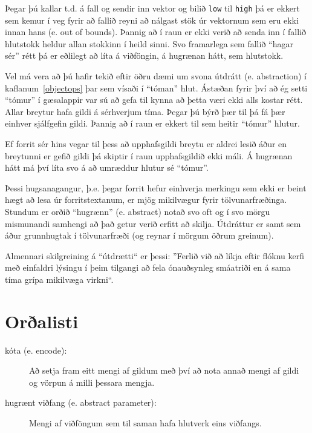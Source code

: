 Þegar þú kallar t.d. á fall og sendir inn vektor og bilið {\tt low} til {\tt high}
þá er ekkert sem kemur í veg fyrir að fallið reyni að nálgast stök úr vektornum sem eru
ekki innan hans (e. out of bounds). 
Þannig að í raun er ekki verið að senda inn í fallið hlutstokk heldur allan stokkinn í heild sinni.
Svo framarlega sem fallið ``hagar sér'' rétt þá er eðlilegt að líta á viðföngin, á hugrænan hátt, sem hlutstokk.

Vel má vera að þú hafir tekið eftir öðru dæmi um svona útdrátt (e. abstraction) í kaflanum~\ref{objectops}
þar sem vísaði í ``tóman'' hlut.
Ástæðan fyrir því að ég setti ``tómur'' í gæsalappir var sú að gefa til kynna að þetta væri ekki alls kostar rétt.
Allar breytur hafa gildi á sérhverjum tíma.
Þegar þú býrð þær til þá fá þær einhver sjálfgefin gildi.
Þannig að í raun er ekkert til sem heitir ``tómur'' hlutur.

Ef forrit sér hins vegar til þess að upphafsgildi breytu er aldrei lesið áður en breytunni er gefið gildi
þá skiptir í raun upphafsgildið ekki máli.
Á hugrænan hátt má því líta svo á að umræddur hlutur sé ``tómur''.

Þessi hugsanagangur, þ.e. þegar forrit hefur einhverja merkingu sem ekki er beint hægt að lesa úr forritstextanum,
er mjög mikilvægur fyrir tölvunarfræðinga.
Stundum er orðið ``hugrænn'' (e. abstract) notað svo oft og í svo mörgu mismunandi samhengi að það getur verið erfitt að skilja.
Útdráttur er samt sem áður grunnhugtak í tölvunarfræði (og reynar í mörgum öðrum greinum).


Almennari skilgreining á ``útdrætti`` er þessi:
''Ferlið við að líkja eftir flóknu kerfi með einfaldri lýsingu í þeim tilgangi að fela
ónauðsynleg smáatriði en á sama tíma grípa mikilvæga virkni``.

\section{Orðalisti}

\begin{description}

\item[kóta (e. encode):]
Að setja fram eitt mengi af gildum með því að nota annað mengi af gildi og vörpun á milli þessara mengja.

\item[hugrænt viðfang (e. abstract parameter):]
Mengi af viðföngum sem til saman hafa hlutverk eins viðfangs.


\end{description}


